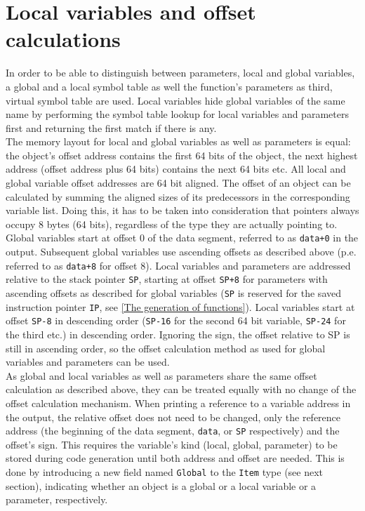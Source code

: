 \documentclass[a4paper]{scrreprt}
\begin{document}
    \section{Local variables and offset calculations}
      In order to be able to distinguish between parameters, local and global variables, a global and a local symbol table as well the function's parameters as third, virtual symbol table are used. Local variables hide global variables of the same name by performing the symbol table lookup for local variables and parameters first and returning the first match if there is any.\\
      The memory layout for local and global variables as well as parameters is equal: the object's offset address contains the first 64 bits of the object, the next highest address (offset address plus 64 bits) contains the next 64 bits etc. All local and global variable offset addresses are 64 bit aligned. The offset of an object can be calculated by summing the aligned sizes of its predecessors in the corresponding variable list. Doing this, it has to be taken into consideration that pointers always occupy 8 bytes (64 bits), regardless of the type they are actually pointing to.\\
      Global variables start at offset 0 of the data segment, referred to as \texttt{data+0} in the output. Subsequent global variables use ascending offsets as described above (p.e. referred to as \texttt{data+8} for offset 8). Local variables and parameters are addressed relative to the stack pointer \texttt{SP}, starting at offset \texttt{SP+8} for parameters with ascending offsets as described for global variables (\texttt{SP} is reserved for the saved instruction pointer \texttt{IP}, see \ref{The generation of functions}). Local variables start at offset \texttt{SP-8} in descending order (\texttt{SP-16} for the second 64 bit variable, \texttt{SP-24} for the third etc.) in descending order. Ignoring the sign, the offset relative to SP is still in ascending order, so the offset calculation method as used for global variables and parameters can be used.\\
      As global and local variables as well as parameters share the same offset calculation as described above, they can be treated equally with no change of the offset calculation mechanism. When printing a reference to a variable address in the output, the relative offset does not need to be changed, only the reference address (the beginning of the data segment, \texttt{data}, or \texttt{SP} respectively) and the offset's sign. This requires the variable's kind (local, global, parameter) to be stored during code generation until both address and offset are needed. This is done by introducing a new field named \texttt{Global} to the \texttt{Item} type (see next section), indicating whether an object is a global or a local variable or a parameter, respectively.\\
\end{document}
